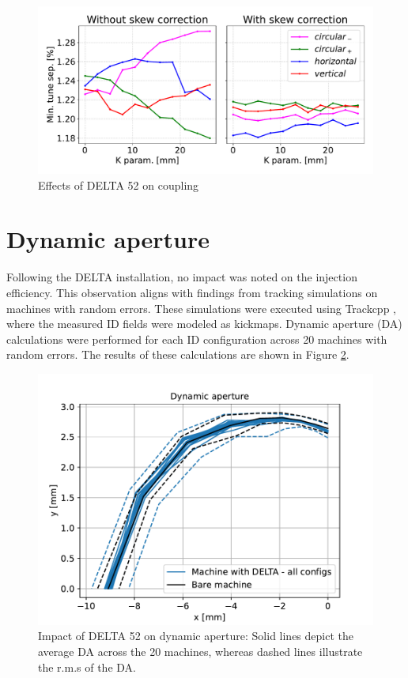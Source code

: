 \documentclass[a4paper,
               keeplastbox,   %
               ]{jacow}
\begin{document}
\begin{figure}[!h]
    \centering
   \includegraphics[width=\columnwidth]{coupling.pdf}
   \caption{Effects of DELTA 52 on coupling}
   \label{fig:coupling}
\end{figure}


\section{Dynamic aperture}

Following the DELTA installation, no impact was noted on the injection efficiency. This observation aligns with findings from tracking simulations on machines with random errors. These simulations were executed using Trackcpp \cite{Trackcpp}, where the measured ID fields were modeled as kickmaps. Dynamic aperture (DA) calculations were performed for each ID configuration across 20 machines with random errors. The results of these calculations are shown in Figure \ref{fig:dynapt}.


\begin{figure}[!h]
    \centering
   \includegraphics[width=0.95\columnwidth]{dynapt.pdf}
   \caption{Impact of DELTA 52 on dynamic aperture: Solid lines depict the average  DA across the 20 machines, whereas dashed lines illustrate the r.m.s of the DA.}
   \label{fig:dynapt}
\end{figure}
\end{document}
